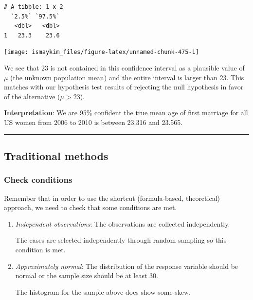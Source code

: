 \documentclass[12pt,]{krantz}
\makeatletter
\newenvironment{Shaded}{\begin{snugshade}}{\end{snugshade}}
\newcommand{\KeywordTok}[1]{\textcolor[rgb]{0.27,0.27,0.27}{\textbf{#1}}}
\newcommand{\DataTypeTok}[1]{\textcolor[rgb]{0.27,0.27,0.27}{#1}}
\newcommand{\StringTok}[1]{\textcolor[rgb]{0.5,0.5,0.5}{#1}}
\newcommand{\OperatorTok}[1]{\textcolor[rgb]{0.43,0.43,0.43}{\textbf{#1}}}
\newcommand{\NormalTok}[1]{#1}
\newenvironment{kframe}{%
\medskip{}
\setlength{\fboxsep}{.8em}
 \def\at@end@of@kframe{}%
 \ifinner\ifhmode%
  \def\at@end@of@kframe{\end{minipage}}%
  \begin{minipage}{\columnwidth}%
 \fi\fi%
 \def\FrameCommand##1{\hskip\@totalleftmargin \hskip-\fboxsep
 \colorbox{shadecolor}{##1}\hskip-\fboxsep
     \hskip-\linewidth \hskip-\@totalleftmargin \hskip\columnwidth}%
 \MakeFramed {\advance\hsize-\width
   \@totalleftmargin\z@ \linewidth\hsize
   \@setminipage}}%
 {\par\unskip\endMakeFramed%
 \at@end@of@kframe}
\renewenvironment{Shaded}{\begin{kframe}}{\end{kframe}}
\makeatother
\begin{document}
\begin{verbatim}
# A tibble: 1 x 2
  `2.5%` `97.5%`
   <dbl>   <dbl>
1   23.3    23.6
\end{verbatim}

\begin{Shaded}
\end{Shaded}

\begin{center}\texttt{[image: ismaykim\_files/figure-latex/unnamed-chunk-475-1]} \end{center}

We see that 23 is not contained in this confidence interval as a
plausible value of \(\mu\) (the unknown population mean) and the entire
interval is larger than 23. This matches with our hypothesis test
results of rejecting the null hypothesis in favor of the alternative
(\(\mu > 23\)).

\textbf{Interpretation}: We are 95\% confident the true mean age of
first marriage for all US women from 2006 to 2010 is between 23.316 and
23.565.

\begin{center}\rule{0.5\linewidth}{\linethickness}\end{center}

\subsection{Traditional methods}\label{traditional-methods}

\subsubsection*{Check conditions}\label{check-conditions}


Remember that in order to use the shortcut (formula-based, theoretical)
approach, we need to check that some conditions are met.

\begin{enumerate}
\def\labelenumi{\arabic{enumi}.}
\item
  \emph{Independent observations}: The observations are collected
  independently.

  The cases are selected independently through random sampling so this
  condition is met.
\item
  \emph{Approximately normal}: The distribution of the response variable
  should be normal or the sample size should be at least 30.

  The histogram for the sample above does show some skew.
\end{enumerate}
\end{document}
